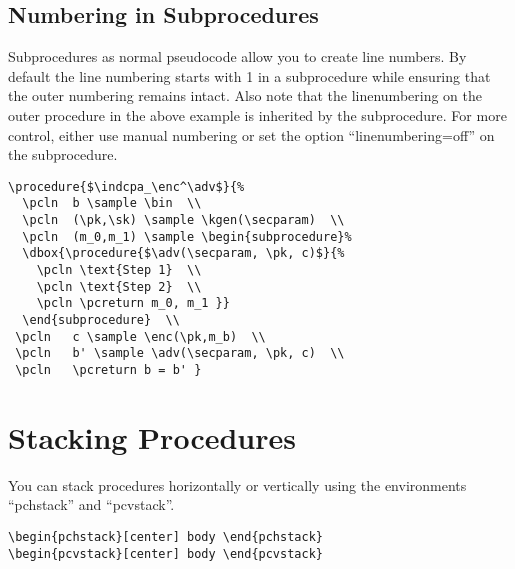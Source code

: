 \documentclass[a4paper]{report}
\begin{document}
\subsection{Numbering in Subprocedures}
Subprocedures as normal pseudocode allow you to create line numbers. By default the line numbering starts with 1 in a subprocedure while
ensuring that the outer numbering remains intact. Also note that the linenumbering on the outer procedure in the above example is inherited
by the subprocedure. For more control, either use manual numbering or set the option \enquote{linenumbering=off} on the subprocedure.

\begin{center}
 \end{center}
  \begin{lstlisting}
\procedure{$\indcpa_\enc^\adv$}{%
  \pcln  b \sample \bin  \\
  \pcln  (\pk,\sk) \sample \kgen(\secparam)  \\
  \pcln  (m_0,m_1) \sample \begin{subprocedure}%
  \dbox{\procedure{$\adv(\secparam, \pk, c)$}{%
  	\pcln \text{Step 1}  \\
  	\pcln \text{Step 2}  \\
	\pcln \pcreturn m_0, m_1 }}
  \end{subprocedure}  \\
 \pcln   c \sample \enc(\pk,m_b)  \\
 \pcln   b' \sample \adv(\secparam, \pk, c)  \\
 \pcln   \pcreturn b = b' }
\end{lstlisting}


\section{Stacking Procedures}
You can stack procedures horizontally or vertically using the environments \enquote{pchstack} and \enquote{pcvstack}. 
\begin{lstlisting}
\begin{pchstack}[center] body \end{pchstack}
\begin{pcvstack}[center] body \end{pcvstack}
\end{lstlisting}
\end{document}
